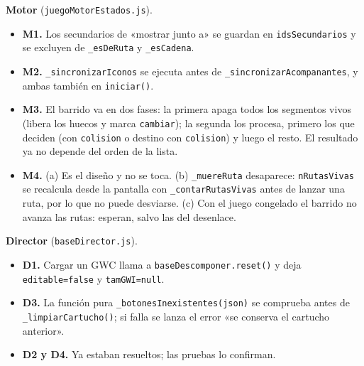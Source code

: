 \textbf{Motor} (\texttt{juegoMotorEstados.js}).
\begin{itemize}
	\item \textbf{M1.} Los secundarios de «mostrar junto a» se guardan en \texttt{idsSecundarios} y se excluyen de \texttt{\_esDeRuta} y \texttt{\_esCadena}.
	\item \textbf{M2.} \texttt{\_sincronizarIconos} se ejecuta antes de \texttt{\_sincronizarAcompanantes}, y ambas también en \texttt{iniciar()}.
	\item \textbf{M3.} El barrido va en dos fases: la primera apaga todos los segmentos vivos (libera los huecos y marca \texttt{cambiar}); la segunda los procesa, primero los que deciden (con \texttt{colision} o destino con \texttt{colision}) y luego el resto. El resultado ya no depende del orden de la lista.
	\item \textbf{M4.} (a) Es el diseño y no se toca. (b) \texttt{\_muereRuta} desaparece: \texttt{nRutasVivas} se recalcula desde la pantalla con \texttt{\_contarRutasVivas} antes de lanzar una ruta, por lo que no puede desviarse. (c) Con el juego congelado el barrido no avanza las rutas: esperan, salvo las del desenlace.
\end{itemize}

\textbf{Director} (\texttt{baseDirector.js}).
\begin{itemize}
	\item \textbf{D1.} Cargar un GWC llama a \texttt{baseDescomponer.reset()} y deja \texttt{editable=false} y \texttt{tamGWI=null}.
	\item \textbf{D3.} La función pura \texttt{\_botonesInexistentes(json)} se comprueba antes de \texttt{\_limpiarCartucho()}; si falla se lanza el error «se conserva el cartucho anterior».
	\item \textbf{D2 y D4.} Ya estaban resueltos; las pruebas lo confirman.
\end{itemize}

